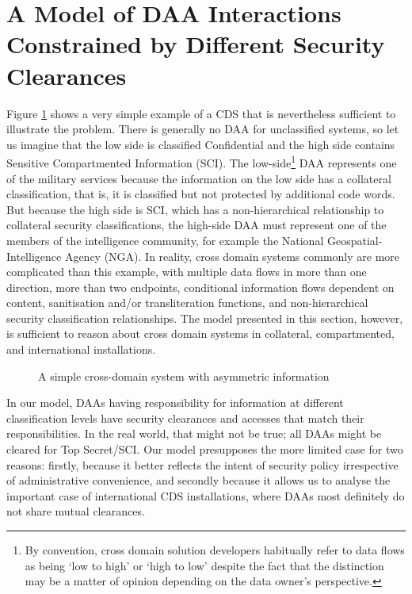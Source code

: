 \documentclass{llncs}
\begin{document}
\section{A Model of DAA Interactions Constrained by Different Security Clearances}

Figure \ref{figure:simplest-possible-CDS} shows a very simple example of
a CDS that is nevertheless sufficient to illustrate the problem.
There is generally no DAA for unclassified systems, so let us imagine that the
low side is classified Confidential and the high side contains Sensitive Compartmented
Information (SCI).
The low-side\footnote{By convention, cross domain solution developers habitually
refer to data flows as being `low to high' or `high to low' despite the
fact that the distinction may be a matter of opinion depending on the data
owner's perspective.} DAA represents one of the military services because the information
on the low side has a collateral classification, that is, it is classified but not
protected by additional code words.  But because the high side is SCI,
which has a non-hierarchical relationship to collateral security classifications,
the high-side DAA must represent one of the members of the intelligence
community, for example the National Geospatial-Intelligence Agency (NGA).
In reality, cross domain systems commonly are more complicated than this example,
with multiple data flows in more than one direction, more than two endpoints,
conditional information flows dependent on content, sanitisation and/or transliteration
functions, and non-hierarchical security classification relationships.  The model
presented in this section, however, is sufficient to reason about cross domain systems
in collateral, compartmented, and international installations.

\begin{figure}[htbp]
    \caption{A simple cross-domain system with asymmetric information}
    \label{figure:simplest-possible-CDS}
\end{figure}

In our model, DAAs having responsibility for information at different
classification levels have security clearances and accesses that match
their responsibilities.  In the real world, that might not be true; all
DAAs might be cleared for Top Secret/SCI.  Our model presupposes the more
limited case for two reasons: firstly, because it better reflects the
intent of security policy irrespective of administrative convenience, and
secondly because it allows us to analyse the important case of international
CDS installations, where DAAs most definitely do not share mutual clearances.
\end{document}
